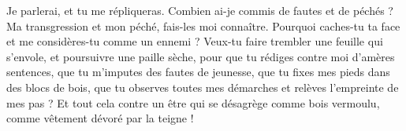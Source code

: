 Je parlerai, et tu me répliqueras.
Combien ai-je commis de fautes et de péchés ? Ma transgression et mon péché, fais-les moi connaître.
Pourquoi caches-tu ta face et me considères-tu comme un ennemi ?
Veux-tu faire trembler une feuille qui s’envole, et poursuivre une paille sèche,
pour que tu rédiges contre moi d’amères sentences, que tu m’imputes des fautes de jeunesse,
que tu fixes mes pieds dans des blocs de bois, que tu observes toutes mes démarches et relèves l’empreinte de mes pas ?
Et tout cela contre un être qui se désagrège comme bois vermoulu, comme vêtement dévoré par la teigne !